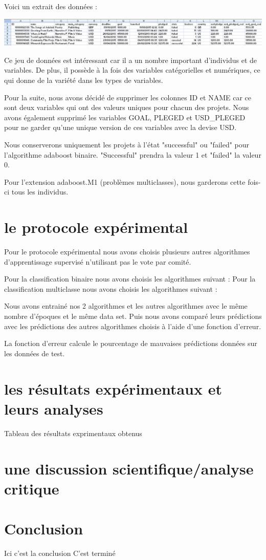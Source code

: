 \documentclass{article}
\begin{document}
\noindent Voici un extrait des données :

\begin{center} \includegraphics[scale=0.55]{extrait_donnees.PNG} \end{center}
\noindent Ce jeu de données est intéressant car il a un nombre important d'individus et de variables. De plus, il possède à la fois des variables catégorielles et numériques, ce qui donne de la variété dans les types de variables. \newline

\noindent Pour la suite, nous avons décidé de supprimer les colonnes ID et NAME car ce sont deux variables qui ont des valeurs uniques pour chacun des projets. Nous avons également supprimé les variables GOAL, PLEGED et USD\_PLEGED pour ne garder qu'une unique version de ces variables avec la devise USD.\newline

\noindent Nous conserverons uniquement les projets à l'état "successful" ou "failed" pour l'algorithme adaboost binaire. "Successful" prendra la valeur 1 et "failed" la valeur 0.\newline

\noindent Pour l'extension adaboost.M1 (problèmes multiclasses), nous garderons cette fois-ci tous les individus.


\section{le protocole expérimental}
Pour le protocole expérimental nous avons choisis plusieurs autres algorithmes d'apprentissage supervisé n'utilisant pas le vote par comité. 

Pour la classification binaire nous avons choisis les algorithmes suivant : 
Pour la classification multiclasse nous avons choisis les algorithmes suivant : 

Nous avons entrainé nos 2 algorithmes et les autres algorithmes avec le même nombre d'époques et le même data set. 
Puis nous avons comparé leurs prédictions avec les prédictions des autres algorithmes choisis à l'aide d'une fonction d'erreur.

La fonction d'erreur calcule le pourcentage de mauvaises prédictions données sur les données de test. 

\section{les résultats expérimentaux et leurs analyses}
Tableau des résultats exprimentaux obtenus

\section{une discussion scientifique/analyse critique}

\section{Conclusion}
Ici c'est la conclusion 
C'est terminé



\end{document}
